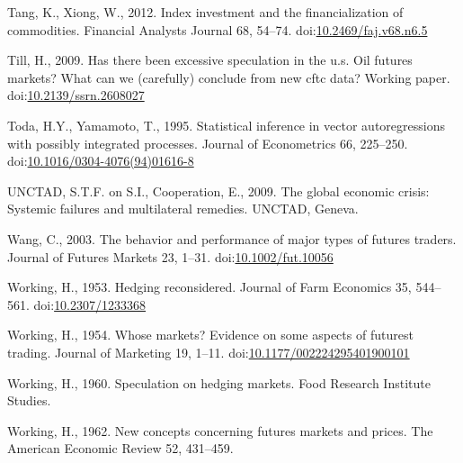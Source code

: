 \documentclass[]{elsarticle} %
\begin{document}
\leavevmode\hypertarget{ref-tang_index_2012}{}%
Tang, K., Xiong, W., 2012. Index investment and the financialization of
commodities. Financial Analysts Journal 68, 54--74.
doi:\href{https://doi.org/10.2469/faj.v68.n6.5}{10.2469/faj.v68.n6.5}

\leavevmode\hypertarget{ref-till_has_2009}{}%
Till, H., 2009. Has there been excessive speculation in the u.s. Oil
futures markets? What can we (carefully) conclude from new cftc data?
Working paper.
doi:\href{https://doi.org/10.2139/ssrn.2608027}{10.2139/ssrn.2608027}

\leavevmode\hypertarget{ref-toda_statistical_1995}{}%
Toda, H.Y., Yamamoto, T., 1995. Statistical inference in vector
autoregressions with possibly integrated processes. Journal of
Econometrics 66, 225--250.
doi:\href{https://doi.org/10.1016/0304-4076(94)01616-8}{10.1016/0304-4076(94)01616-8}

\leavevmode\hypertarget{ref-unctad_global_2009}{}%
UNCTAD, S.T.F. on S.I., Cooperation, E., 2009. The global economic
crisis: Systemic failures and multilateral remedies. UNCTAD, Geneva.

\leavevmode\hypertarget{ref-wang_behavior_2003}{}%
Wang, C., 2003. The behavior and performance of major types of futures
traders. Journal of Futures Markets 23, 1--31.
doi:\href{https://doi.org/10.1002/fut.10056}{10.1002/fut.10056}

\leavevmode\hypertarget{ref-working_hedging_1953}{}%
Working, H., 1953. Hedging reconsidered. Journal of Farm Economics 35,
544--561. doi:\href{https://doi.org/10.2307/1233368}{10.2307/1233368}

\leavevmode\hypertarget{ref-working_whose_1954}{}%
Working, H., 1954. Whose markets? Evidence on some aspects of futurest
trading. Journal of Marketing 19, 1--11.
doi:\href{https://doi.org/10.1177/002224295401900101}{10.1177/002224295401900101}

\leavevmode\hypertarget{ref-working_speculation_1960}{}%
Working, H., 1960. Speculation on hedging markets. Food Research
Institute Studies.

\leavevmode\hypertarget{ref-working_new_1962}{}%
Working, H., 1962. New concepts concerning futures markets and prices.
The American Economic Review 52, 431--459.
\end{document}
